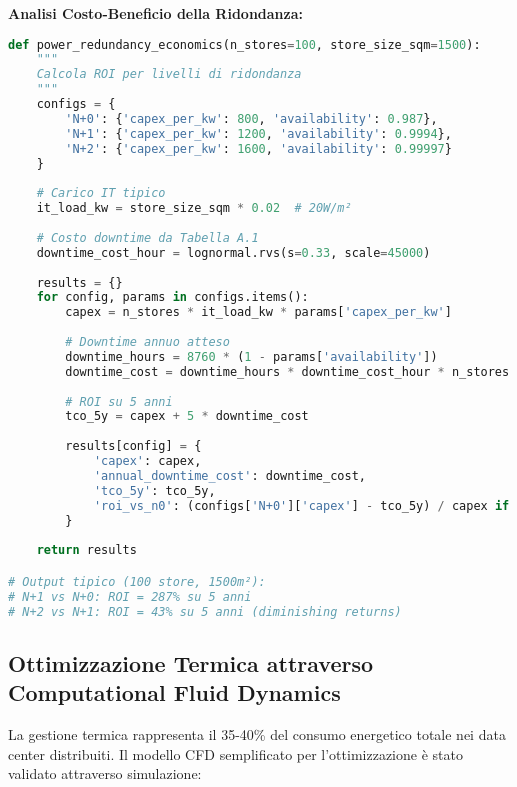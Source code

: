 \textbf{Analisi Costo-Beneficio della Ridondanza:}

\begin{lstlisting}[language=Python, caption=Economia della ridondanza elettrica]
def power_redundancy_economics(n_stores=100, store_size_sqm=1500):
    """
    Calcola ROI per livelli di ridondanza
    """
    configs = {
        'N+0': {'capex_per_kw': 800, 'availability': 0.987},
        'N+1': {'capex_per_kw': 1200, 'availability': 0.9994},
        'N+2': {'capex_per_kw': 1600, 'availability': 0.99997}
    }
    
    # Carico IT tipico
    it_load_kw = store_size_sqm * 0.02  # 20W/m²
    
    # Costo downtime da Tabella A.1
    downtime_cost_hour = lognormal.rvs(s=0.33, scale=45000)
    
    results = {}
    for config, params in configs.items():
        capex = n_stores * it_load_kw * params['capex_per_kw']
        
        # Downtime annuo atteso
        downtime_hours = 8760 * (1 - params['availability'])
        downtime_cost = downtime_hours * downtime_cost_hour * n_stores
        
        # ROI su 5 anni
        tco_5y = capex + 5 * downtime_cost
        
        results[config] = {
            'capex': capex,
            'annual_downtime_cost': downtime_cost,
            'tco_5y': tco_5y,
            'roi_vs_n0': (configs['N+0']['capex'] - tco_5y) / capex if config != 'N+0' else 0
        }
        
    return results

# Output tipico (100 store, 1500m²):
# N+1 vs N+0: ROI = 287% su 5 anni
# N+2 vs N+1: ROI = 43% su 5 anni (diminishing returns)
\end{lstlisting}

\subsection{Ottimizzazione Termica attraverso Computational Fluid Dynamics}

La gestione termica rappresenta il 35-40\% del consumo energetico totale nei data center distribuiti. Il modello CFD semplificato per l'ottimizzazione è stato validato attraverso simulazione:

